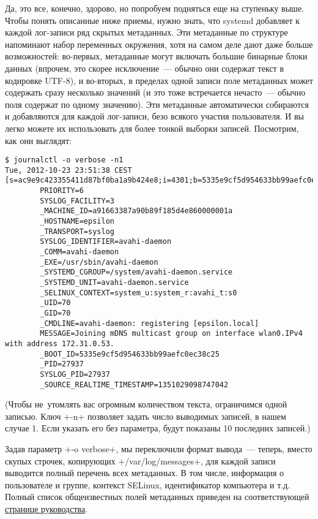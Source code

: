 \documentclass[10pt,oneside,a4paper]{article}
\begin{document}
Да, это все, конечно, здорово, но попробуем подняться еще на ступеньку выше.
Чтобы понять описанные ниже приемы, нужно знать, что systemd добавляет к
каждой лог-записи ряд скрытых метаданных. Эти метаданные по структуре напоминают
набор переменных окружения, хотя на самом деле дают даже больше возможностей:
во-первых, метаданные могут включать большие бинарные блоки данных (впрочем, это
скорее исключение~--- обычно они содержат текст в кодировке UTF-8), и во-вторых,
в пределах одной записи поле метаданных может содержать сразу несколько
значений (и это тоже встречается нечасто~--- обычно поля содержат по одному
значению). Эти метаданные автоматически собираются и добавляются для каждой
лог-записи, безо всякого участия пользователя. И вы легко можете их использовать
для более тонкой выборки записей. Посмотрим, как они выглядят:
\begin{Verbatim}
$ journalctl -o verbose -n1
Tue, 2012-10-23 23:51:38 CEST [s=ac9e9c423355411d87bf0ba1a9b424e8;i=4301;b=5335e9cf5d954633bb99aefc0ec38c25;m=882ee28d2;t=4ccc0f98326e6;x=f21e8b1b0994d7ee]
        PRIORITY=6
        SYSLOG_FACILITY=3
        _MACHINE_ID=a91663387a90b89f185d4e860000001a
        _HOSTNAME=epsilon
        _TRANSPORT=syslog
        SYSLOG_IDENTIFIER=avahi-daemon
        _COMM=avahi-daemon
        _EXE=/usr/sbin/avahi-daemon
        _SYSTEMD_CGROUP=/system/avahi-daemon.service
        _SYSTEMD_UNIT=avahi-daemon.service
        _SELINUX_CONTEXT=system_u:system_r:avahi_t:s0
        _UID=70
        _GID=70
        _CMDLINE=avahi-daemon: registering [epsilon.local]
        MESSAGE=Joining mDNS multicast group on interface wlan0.IPv4 with address 172.31.0.53.
        _BOOT_ID=5335e9cf5d954633bb99aefc0ec38c25
        _PID=27937
        SYSLOG_PID=27937
        _SOURCE_REALTIME_TIMESTAMP=1351029098747042
\end{Verbatim}
(Чтобы не~утомлять вас огромным количеством текста, ограничимся одной записью.
Ключ +-n+ позволяет задать число выводимых записей, в нашем случае 1. Если
указать его без параметра, будут показаны 10 последних записей.)

Задав параметр +-o verbose+, мы переключили формат вывода~--- теперь, вместо
скупых строчек, копирующих +/var/log/messages+, для каждой записи выводится
полный перечень всех метаданных. В том числе, информация о пользователе и
группе, контекст SELinux, идентификатор компьютера и т.д. Полный список
общеизвестных полей метаданных приведен на соответствующей
\href{http://www.freedesktop.org/software/systemd/man/systemd.journal-fields.html}%
{странице руководства}.
\end{document}
